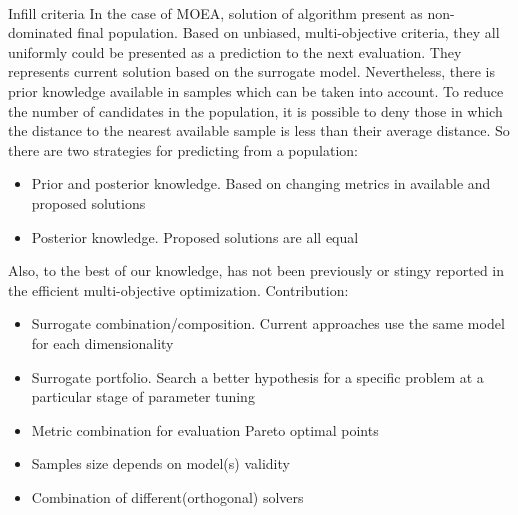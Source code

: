         \paragraph{}{Infill criteria}
        In the case of MOEA, solution of algorithm present as non-dominated final population. Based on unbiased, multi-objective criteria, they all uniformly could be presented as a prediction to the next evaluation. They represents current solution based on the surrogate model. Nevertheless, there is prior knowledge available in samples which can be taken into account. To reduce the number of candidates in the population, it is possible to deny those in which the distance to the nearest available sample is less than their average distance.
        So there are two strategies for predicting from a population:
        \begin{itemize}
            \item Prior and posterior knowledge. Based on changing metrics in available and proposed solutions
            \item Posterior knowledge. Proposed solutions are all equal
        \end{itemize}


        
        Also, to the best of our knowledge, has not been previously or stingy reported in the efficient multi-objective optimization.
        Contribution:
        \begin{itemize}
            \item Surrogate combination/composition. Current approaches use the same model for each dimensionality
            \item Surrogate portfolio. Search a better hypothesis  for a specific problem at a particular stage of parameter tuning
            \item Metric combination for evaluation Pareto optimal points
            \item Samples size depends on model(s) validity
            \item Combination of different(orthogonal) solvers
        \end{itemize}

